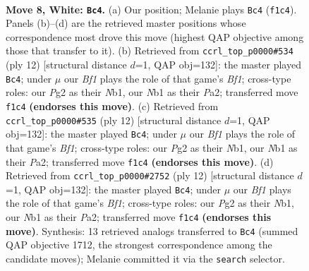 \documentclass[11pt]{article}
\begin{document}
\begin{figure}[p]\centering
\begin{subfigure}{0.46\textwidth}\centering
\resizebox{\linewidth}{!}{%
\newchessgame
\chessboard[
  setfen={r1bqkbr1/pp2pppp/2np4/3nP3/3P3P/5N2/PP3PP1/RNBQKB1R w KQq - 1 8},
  showmover=false,
  pgfstyle=straightmove, color=movearrow, markmove={f1-c4}
]}
\caption{}
\end{subfigure}\hfill
\begin{subfigure}{0.46\textwidth}\centering
\resizebox{\linewidth}{!}{%
\newchessgame
\chessboard[
  setfen={r1bqkb1r/pp2pppp/2np4/3nP3/3P4/5N2/PP3PPP/RNBQKB1R w KQkq - 2 7},
  showmover=false,
  pgfstyle=straightmove, color=movearrow, markmove={f1-c4}
]}
\caption{}
\end{subfigure}
\\[4pt]
\begin{subfigure}{0.46\textwidth}\centering
\resizebox{\linewidth}{!}{%
\newchessgame
\chessboard[
  setfen={r1bqkb1r/pp2pppp/2np4/3nP3/3P4/5N2/PP3PPP/RNBQKB1R w KQkq - 2 7},
  showmover=false,
  pgfstyle=straightmove, color=movearrow, markmove={f1-c4}
]}
\caption{}
\end{subfigure}\hfill
\begin{subfigure}{0.46\textwidth}\centering
\resizebox{\linewidth}{!}{%
\newchessgame
\chessboard[
  setfen={r1bqkb1r/pp2pppp/2np4/3nP3/3P4/5N2/PP3PPP/RNBQKB1R w KQkq - 2 7},
  showmover=false,
  pgfstyle=straightmove, color=movearrow, markmove={f1-c4}
]}
\caption{}
\end{subfigure}
\caption{\textbf{Move 8, White: \texttt{Bc4}.} (a) Our position; Melanie plays \texttt{Bc4} (\texttt{f1c4}). Panels (b)--(d) are the retrieved master positions whose correspondence most drove this move (highest QAP objective among those that transfer to it). (b) Retrieved from \texttt{ccrl\_top\_p0000\#534} (ply 12) [structural distance $d$=1, QAP obj=132]: the master played \texttt{Bc4}; under $\mu$ our \emph{Bf1} plays the role of that game's \emph{Bf1}; cross-type roles: our \emph{P}g2 as their \emph{N}b1, our \emph{N}b1 as their \emph{P}a2; transferred move \texttt{f1c4} \textbf{(endorses this move)}. (c) Retrieved from \texttt{ccrl\_top\_p0000\#535} (ply 12) [structural distance $d$=1, QAP obj=132]: the master played \texttt{Bc4}; under $\mu$ our \emph{Bf1} plays the role of that game's \emph{Bf1}; cross-type roles: our \emph{P}g2 as their \emph{N}b1, our \emph{N}b1 as their \emph{P}a2; transferred move \texttt{f1c4} \textbf{(endorses this move)}. (d) Retrieved from \texttt{ccrl\_top\_p0000\#2752} (ply 12) [structural distance $d$=1, QAP obj=132]: the master played \texttt{Bc4}; under $\mu$ our \emph{Bf1} plays the role of that game's \emph{Bf1}; cross-type roles: our \emph{P}g2 as their \emph{N}b1, our \emph{N}b1 as their \emph{P}a2; transferred move \texttt{f1c4} \textbf{(endorses this move)}. Synthesis: 13 retrieved analogs transferred to \texttt{Bc4} (summed QAP objective 1712, the strongest correspondence among the candidate moves); Melanie committed it via the \texttt{search} selector.}
\label{fig:thought-m14}
\end{figure}
\end{document}

